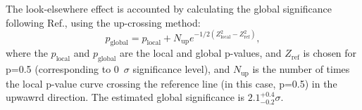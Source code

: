 The look-elsewhere effect is accounted by calculating the global significance
following Ref.\cite{global-significance}, using the up-crossing method:
\[ p_\text{global} = p_\text{local} +  N_\text{up} e^{-1/2(Z^2_\text{local} - Z^2_\text{ref})},
\]
where the $p_\text{local}$ and $p_\text{global}$ are the local and global p-values, and
$Z_\text{ref}$ is chosen for p=0.5 (corresponding to 0~$\sigma$ significance level), 
and $N_\text{up}$ is the number of times the local p-value curve crossing the reference line (in this case,
p=0.5) in the upwawrd direction.
The estimated global significance is $2.1^{+0.4}_{-0.2} \sigma$.
